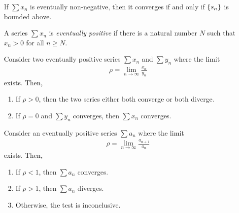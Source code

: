 \documentclass{article}
\begin{document}
\begin{theorem}
  If $\sum x_n$ is eventually non-negative, then it converges if and only if $\{s_n\}$ is bounded above.
\end{theorem}

\begin{definition}
  A series $\sum x_n$ is \emph{eventually positive} if there is a natural number $N$ such that $x_n > 0$ for all $n \geq N$.
\end{definition}

\begin{theorem}
  Consider two eventually positive series $\sum x_n$ and $\sum y_n$ where the limit
  \begin{align}
    \rho = \lim_{n \to \infty} \frac{x_n}{y_n}
  \end{align}
  exists.
  Then,
  \begin{enumerate}
    \item If $\rho > 0$, then the two series either both converge or both diverge.
    \item If $\rho = 0$ and $\sum y_n$ converges, then $\sum x_n$ converges.
  \end{enumerate}
\end{theorem}

\begin{theorem}
  Consider an eventually positive series $\sum a_n$ where the limit
  \begin{align}
    \rho = \lim_{n \to \infty} \frac{a_{n + 1}}{a_n}
  \end{align}
  exists.
  Then,
  \begin{enumerate}
    \item If $\rho < 1$, then $\sum a_n$ converges.
    \item If $\rho > 1$, then $\sum a_n$ diverges.
    \item Otherwise, the test is inconclusive.
  \end{enumerate}
\end{theorem}
\end{document}
